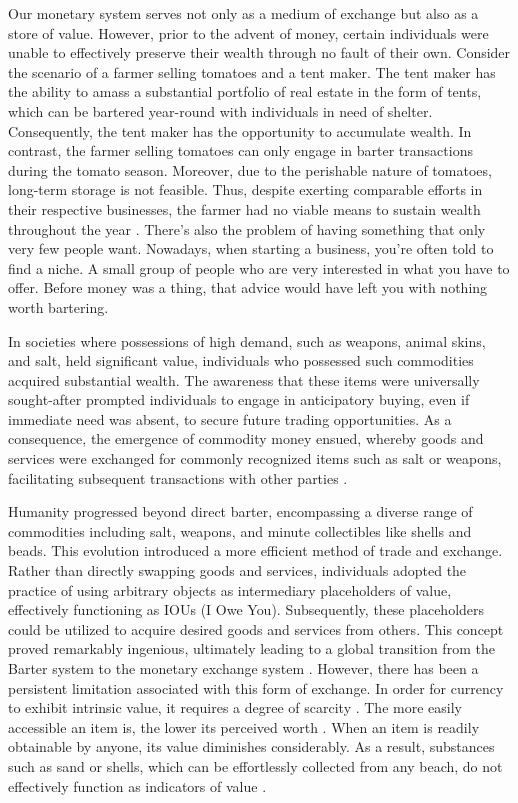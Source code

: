 Our monetary system serves not only as a medium of exchange but also as a store of value. However, prior to the advent of money, certain
individuals were unable to effectively preserve their wealth through no fault of their own. Consider the scenario of a farmer selling tomatoes
and a tent maker. The tent maker has the ability to amass a substantial portfolio of real estate in the form of tents, which can be bartered
year-round with individuals in need of shelter. Consequently, the tent maker has the opportunity to accumulate wealth. In contrast, the farmer
selling tomatoes can only engage in barter transactions during the tomato season. Moreover, due to the perishable nature of tomatoes, long-term
storage is not feasible. Thus, despite exerting comparable efforts in their respective businesses, the farmer had no viable means to sustain
wealth throughout the year \cite{de2016origins}. There's also the problem of having something that only very few people want. Nowadays,
when starting a business, you're often told to find a niche. A small group of people who are very interested in what you have to offer. Before
money was a thing, that advice would have left you with nothing worth bartering.

In societies where possessions of high demand, such as weapons, animal skins, and salt, held significant value, individuals who possessed
such commodities acquired substantial wealth. The awareness that these items were universally sought-after prompted individuals to engage in
anticipatory buying, even if immediate need was absent, to secure future trading opportunities. As a consequence, the emergence of commodity
money ensued, whereby goods and services were exchanged for commonly recognized items such as salt or weapons, facilitating subsequent
transactions with other parties \cite{polanyi1965trade}.

Humanity progressed beyond direct barter, encompassing a diverse range of commodities including salt, weapons, and minute collectibles like
shells and beads. This evolution introduced a more efficient method of trade and exchange. Rather than directly swapping goods and services,
individuals adopted the practice of using arbitrary objects as intermediary placeholders of value, effectively functioning as IOUs (I Owe You).
Subsequently, these placeholders could be utilized to acquire desired goods and services from others. This concept proved remarkably ingenious,
ultimately leading to a global transition from the Barter system to the monetary exchange system \cite{graeber2012debt}. However, there has
been a persistent limitation associated with this form of exchange. In order for currency to exhibit intrinsic value, it requires a degree of
scarcity \cite{smith2010wealth, ricardo1821principles}. The more easily accessible an item is, the lower its perceived worth
\cite{marshall2009principles}. When an item is readily obtainable by anyone, its value diminishes considerably. As a result, substances such
as sand or shells, which can be effortlessly collected from any beach, do not effectively function as indicators of value
\cite{principlesmenger, hicks1936keynes}.

